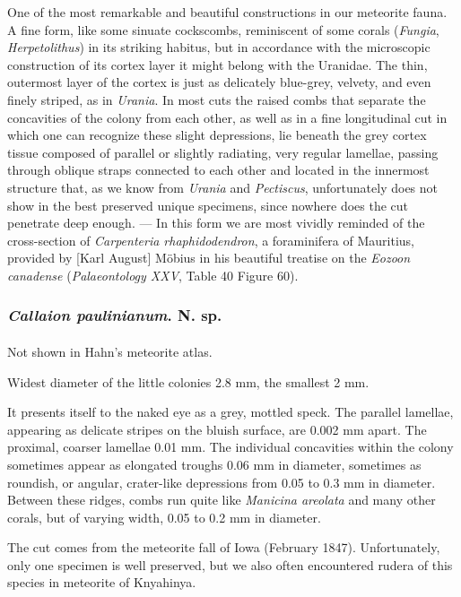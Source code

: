 \documentclass[a4paper, 12pt, oneside]{article}
\begin{document}
One of the most remarkable and beautiful constructions in our meteorite fauna. A fine form, like some sinuate cockscombs, reminiscent of some corals (\emph{Fungia}, \emph{Herpetolithus}) in its striking habitus, but in accordance with the microscopic construction of its cortex layer it might belong with the Uranidae. The thin, outermost layer of the cortex is just as delicately blue-grey, velvety, and even finely striped, as in \emph{Urania}. In most cuts the raised combs that separate the concavities of the colony from each other, as well as in a fine longitudinal cut in which one can recognize these slight depressions, lie beneath the grey cortex tissue composed of parallel or slightly radiating, very regular lamellae, passing through oblique straps connected to each other and located in the innermost structure that, as we know from \emph{Urania} and \emph{Pectiscus}, unfortunately does not show in the best preserved unique specimens, since nowhere does the cut penetrate deep enough. --- In this form we are most vividly reminded of the cross-section of \emph{Carpenteria rhaphidodendron}, a foraminifera of Mauritius, provided by [Karl August] Möbius in his beautiful treatise on the \emph{Eozoon canadense} (\emph{Palaeontology XXV}, Table 40 Figure 60).
\subsubsection{\emph{Callaion paulinianum}. N. sp.}
\paragraph{}
Not shown in Hahn's meteorite atlas.

Widest diameter of the little colonies 2.8 mm, the smallest 2 mm.

It presents itself to the naked eye as a grey, mottled speck. The parallel lamellae, appearing as delicate stripes on the bluish surface, are 0.002 mm apart. The proximal, coarser lamellae 0.01 mm. The individual concavities within the colony sometimes appear as elongated troughs 0.06 mm in diameter, sometimes as roundish, or angular, crater-like depressions from 0.05 to 0.3 mm in diameter. Between these ridges, combs run quite like \emph{Manicina areolata} and many other corals, but of varying width, 0.05 to 0.2 mm in diameter.

The cut comes from the meteorite fall of Iowa (February 1847). Unfortunately, only one specimen is well preserved, but we also often encountered rudera of this species in meteorite of Knyahinya.
\end{document}
